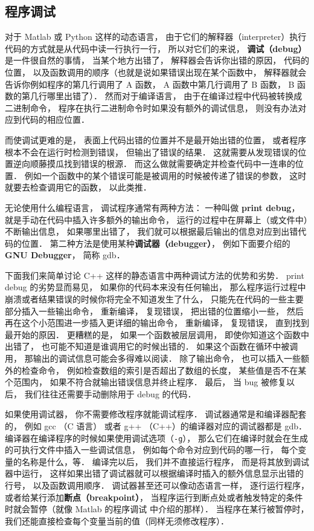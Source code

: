 
\subsection{程序调试}

对于 Matlab 或 Python 这样的动态语言， 由于它们的解释器（interpreter）执行代码的方式就是从代码中读一行执行一行， 所以对它们的来说， \textbf{调试（debug）}是一件很自然的事情， 当某个地方出错了， 解释器会告诉你出错的原因， 代码的位置， 以及函数调用的顺序（也就是说如果错误出现在某个函数中， 解释器就会告诉你例如程序的第几行调用了 A 函数， A 函数中第几行调用了 B 函数， B 函数的第几行哪里出错了）． 然而对于编译语言， 由于在编译过程中代码被转换成二进制命令， 程序在执行二进制命令时如果没有额外的调试信息， 则没有办法对应到代码的相应位置．

而使调试更难的是， 表面上代码出错的位置并不是最开始出错的位置， 或者程序根本不会在运行时检测到错误， 但输出了错误的结果． 这就需要从发现错误的位置逆向顺藤摸瓜找到错误的根源． 而这么做就需要确定并检查代码中一连串的位置． 例如一个函数中的某个错误可能是被调用的时候被传递了错误的参数， 这时就要去检查调用它的函数， 以此类推．

无论使用什么编程语言， 调试程序通常有两种方法： 一种叫做 \textbf{print debug}， 就是手动在代码中插入许多额外的输出命令， 运行的过程中在屏幕上（或文件中）不断输出信息， 如果哪里出错了， 我们就可以根据最后输出的信息对应到出错代码的位置． 第二种方法是使用某种\textbf{调试器（debugger）}， 例如下面要介绍的 \textbf{GNU Debugger}， 简称 gdb．

下面我们来简单讨论 C++ 这样的静态语言中两种调试方法的优势和劣势． print debug 的劣势显而易见， 如果你的代码本来没有任何输出， 那么程序运行过程中崩溃或者结果错误的时候你将完全不知道发生了什么， 只能先在代码的一些主要部分插入一些输出命令， 重新编译， 复现错误， 把出错的位置缩小一些， 然后再在这个小范围进一步插入更详细的输出命令， 重新编译， 复现错误， 直到找到最开始的原因． 更糟糕的是， 如果一个函数被层层调用， 即使你知道这个函数中出错了， 也可能不知道是谁调用它的时候出错的． 如果这个函数在循环中被调用， 那输出的调试信息可能会多得难以阅读． 除了输出命令， 也可以插入一些额外的检查命令， 例如检查数组的索引是否超出了数组的长度， 某些值是否不在某个范围内， 如果不符合就输出错误信息并终止程序． 最后， 当 bug 被修复以后， 我们往往还需要手动删除用于 debug 的代码．

如果使用调试器， 你不需要修改程序就能调试程序． 调试器通常是和编译器配套的， 例如 gcc （C 语言） 或者 g++ （C++）的编译器对应的调试器都是 gdb． 编译器在编译程序的时候如果使用调试选项（\verb|-g|）， 那么它们在编译时就会在生成的可执行文件中插入一些调试信息， 例如每个命令对应到代码的哪一行， 每个变量的名称是什么，等． 编译完以后， 我们并不直接运行程序， 而是将其放到调试器中运行， 这样如果出错了调试器就可以根据编译时插入的额外信息显示出错的行号， 以及函数调用顺序． 调试器甚至还可以像动态语言一样， 逐行运行程序， 或者给某行添加\textbf{断点（breakpoint）}， 当程序运行到断点处或者触发特定的条件时就会暂停（就像 Matlab 的程序调试 中介绍的那样）． 当程序在某行被暂停时， 我们还能直接检查每个变量当前的值（同样无须修改程序）．

